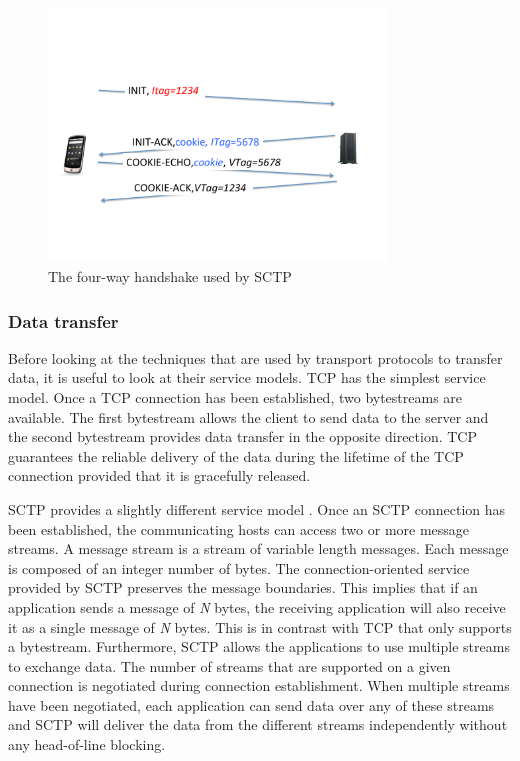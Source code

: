 \begin{figure}
\begin{center}
\includegraphics[width=0.8\textwidth]{figures/mptcp-ebook/Diapositive06.pdf}
\end{center}
\caption{The four-way handshake used by SCTP}\label{fig:sctp-4way}
\end{figure}


\subsubsection{Data transfer}

Before looking at the techniques that are used by transport protocols to transfer data, it is useful to look at their service models. TCP has the simplest service model. Once a TCP connection has been established, two bytestreams are available. The first bytestream allows the client to send data to the server and the second bytestream provides data transfer in the opposite direction. TCP guarantees the reliable delivery of the data during the lifetime of the TCP connection provided that it is gracefully released.

SCTP provides a slightly different service model \cite{rfc3286}. Once an SCTP connection has been established, the communicating hosts can access two or more message streams. A message stream is a stream of variable length messages. Each message is composed of an integer number of bytes. The connection-oriented service provided by SCTP preserves the message boundaries. This implies that if an application sends a message of \emph{N} bytes, the receiving application will also receive it as a single message of \emph{N} bytes. This is in contrast with TCP that only supports a bytestream. Furthermore, SCTP allows the applications to use multiple streams to exchange data. The number of streams that are supported on a given connection is negotiated during connection establishment. When multiple streams have been negotiated, each application can send data over any of these streams and SCTP will deliver the data from the different streams independently without any head-of-line blocking. 

